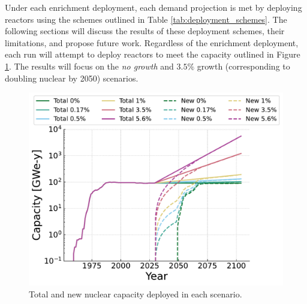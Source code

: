
Under each enrichment deployment, each demand projection is met by deploying reactors using the
schemes outlined in Table \ref{tab:deployment_schemes}. The following sections will discuss the results of these deployment schemes, their limitations, and propose future work. Regardless of the enrichment deployment, each run will attempt to deploy reactors to meet the capacity outlined in Figure \ref{fig:dep_goals}. The results will focus on the \textit{no growth} and $3.5\%$ growth (corresponding to doubling nuclear by 2050) scenarios.

\begin{figure}[H]
    \centering
    \includegraphics[scale=0.7]{images/results/deployment_calcs/total_new_capacity_scenarios.pdf}
    \caption{Total and new nuclear capacity deployed in each scenario.}
    \label{fig:dep_goals}
\end{figure}

